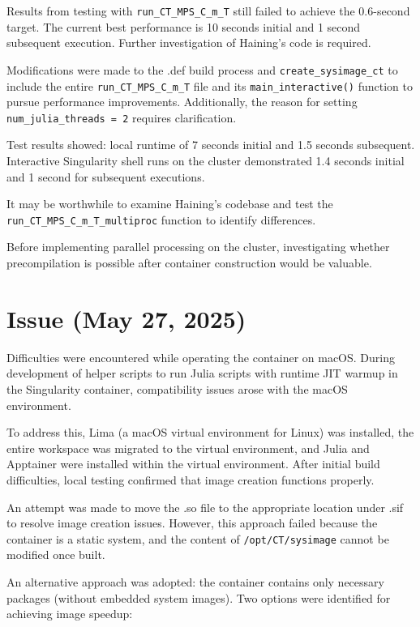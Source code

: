 \documentclass[11pt,a4paper]{article}
\begin{document}
Results from testing with \texttt{run\_CT\_MPS\_C\_m\_T} still failed to achieve the 0.6-second target. The current best performance is 10 seconds initial and 1 second subsequent execution. Further investigation of Haining's code is required.

Modifications were made to the .def build process and \texttt{create\_sysimage\_ct} to include the entire \texttt{run\_CT\_MPS\_C\_m\_T} file and its \texttt{main\_interactive()} function to pursue performance improvements. Additionally, the reason for setting \texttt{num\_julia\_threads = 2} requires clarification.

Test results showed: local runtime of 7 seconds initial and 1.5 seconds subsequent. Interactive Singularity shell runs on the cluster demonstrated 1.4 seconds initial and 1 second for subsequent executions.

It may be worthwhile to examine Haining's codebase and test the \texttt{run\_CT\_MPS\_C\_m\_T\_multiproc} function to identify differences.

Before implementing parallel processing on the cluster, investigating whether precompilation is possible after container construction would be valuable.

\section{Issue (May 27, 2025)}

Difficulties were encountered while operating the container on macOS. During development of helper scripts to run Julia scripts with runtime JIT warmup in the Singularity container, compatibility issues arose with the macOS environment.

To address this, Lima (a macOS virtual environment for Linux) was installed, the entire workspace was migrated to the virtual environment, and Julia and Apptainer were installed within the virtual environment. After initial build difficulties, local testing confirmed that image creation functions properly.

An attempt was made to move the .so file to the appropriate location under .sif to resolve image creation issues. However, this approach failed because the container is a static system, and the content of \texttt{/opt/CT/sysimage} cannot be modified once built.

An alternative approach was adopted: the container contains only necessary packages (without embedded system images). Two options were identified for achieving image speedup:
\end{document}
